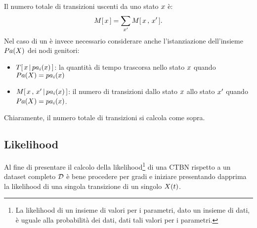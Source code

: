 Il numero totale di transizioni uscenti da uno stato $\mathnormal{x}$ è:
\[
\mstat{x}=\sum_{\setel{x}^\prime}\mstat[x]{\setel{x}^\prime}\text{.}
\]
Nel caso di un \mprocess*{} \cond*{} è invece necessario considerare anche l'istanziazione dell'insieme $Pa(\mathnormal{X})$ dei nodi genitori:
\begin{itemize}
    \item $T[\,\mathnormal{x\,\arrowvert\,pa_i(\mathnormal{x})}\,]$: la quantità di tempo trascorsa nello stato $\mathnormal{x}$ quando $Pa(\mathnormal{X})=pa_i(\mathnormal{x})$
    \item $\mstat[x]{\setel{x}^\prime\,\arrowvert\,pa_i(\setel{x})}$: il numero di transizioni dallo stato $\mathnormal{x}$ allo stato $\mathnormal{x}^\prime$ quando $Pa(\mathnormal{X})=pa_i(\mathnormal{x})$.
\end{itemize}
Chiaramente, il numero totale di transizioni si calcola come sopra.

\subsection{Likelihood}
\label{sec:ctbn-likelihood}
Al fine di presentare il calcolo della likelihood\footnote{\label{note:likelihood}La likelihood di un insieme di valori per i parametri, dato un insieme di dati, è uguale alla probabilità dei dati, dati tali valori per i parametri.} di una \acs{CTBN} rispetto a un dataset completo $\mathcal{D}$ è bene procedere per gradi e iniziare presentando dapprima la likelihood di una singola transizione di un singolo \mprocess*{} \omog*{} $\mathnormal{X}(t)$.

